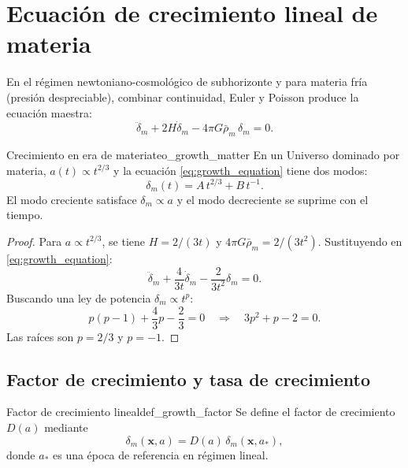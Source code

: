 \section{Ecuación de crecimiento lineal de materia}
\label{sec:crecimiento_lineal_materia}

En el régimen newtoniano-cosmológico de subhorizonte y para materia fría (presión despreciable), combinar continuidad, Euler y Poisson produce la ecuación maestra:
\begin{equation}
\ddot\delta_m + 2H\dot\delta_m -4\pi G\bar\rho_m\,\delta_m =0.
\label{eq:growth_equation}
\end{equation}

\begin{teorema}{Crecimiento en era de materia}{teo_growth_matter}
En un Universo dominado por materia, $a(t)\propto t^{2/3}$ y la ecuación \eqref{eq:growth_equation} tiene dos modos:
\begin{equation}
\delta_m(t)=A\,t^{2/3}+B\,t^{-1}.
\end{equation}
El modo creciente satisface $\delta_m\propto a$ y el modo decreciente se suprime con el tiempo.
\end{teorema}

\begin{proof}
Para $a\propto t^{2/3}$, se tiene $H=2/(3t)$ y $4\pi G\bar\rho_m=2/(3t^2)$. Sustituyendo en \eqref{eq:growth_equation}:
\begin{equation}
\ddot\delta_m+\frac{4}{3t}\dot\delta_m-\frac{2}{3t^2}\delta_m=0.
\end{equation}
Buscando una ley de potencia $\delta_m\propto t^p$:
\begin{equation}
p(p-1)+\frac{4}{3}p-\frac{2}{3}=0
\quad\Rightarrow\quad
3p^2+p-2=0.
\end{equation}
Las raíces son $p=2/3$ y $p=-1$.
\end{proof}

\subsection{Factor de crecimiento y tasa de crecimiento}

\begin{definicion}{Factor de crecimiento lineal}{def_growth_factor}
Se define el factor de crecimiento $D(a)$ mediante
\begin{equation}
\delta_m(\mathbf{x},a)=D(a)\,\delta_m(\mathbf{x},a_\ast),
\end{equation}
donde $a_\ast$ es una época de referencia en régimen lineal.
\end{definicion}


